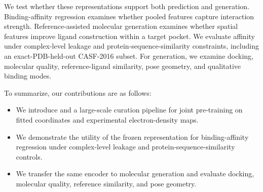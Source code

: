 We test whether these representations support both prediction and generation.
Binding-affinity regression examines whether pooled features capture
interaction strength. Reference-assisted molecular generation examines whether
spatial features improve ligand construction within a target pocket. We
evaluate affinity under complex-level leakage and protein-sequence-similarity
constraints, including an exact-PDB-held-out CASF-2016 subset. For generation,
we examine docking, molecular quality, reference-ligand similarity, pose
geometry, and qualitative binding modes.

To summarize, our contributions are as follows:
\begin{itemize}
    \item We introduce \ours{} and a large-scale curation pipeline for joint
    pre-training on fitted coordinates and experimental electron-density maps.
    \item We demonstrate the utility of the frozen representation for
    binding-affinity regression under complex-level leakage and
    protein-sequence-similarity controls.
    \item We transfer the same encoder to molecular generation and evaluate
    docking, molecular quality, reference similarity, and pose geometry.
\end{itemize}
